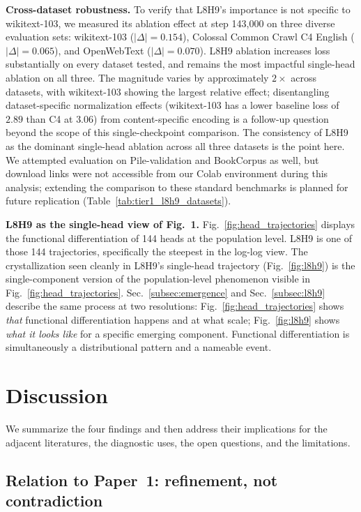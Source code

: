 \documentclass{article}
\begin{document}
\textbf{Cross-dataset robustness.} To verify that L8H9's importance is not specific to wikitext-103, we measured its ablation effect at step 143{,}000 on three diverse evaluation sets: wikitext-103 ($|\Delta| = 0.154$), Colossal Common Crawl C4 English ($|\Delta| = 0.065$), and OpenWebText ($|\Delta| = 0.070$). L8H9 ablation increases loss substantially on every dataset tested, and remains the most impactful single-head ablation on all three. The magnitude varies by approximately $2\times$ across datasets, with wikitext-103 showing the largest relative effect; disentangling dataset-specific normalization effects (wikitext-103 has a lower baseline loss of $2.89$ than C4 at $3.06$) from content-specific encoding is a follow-up question beyond the scope of this single-checkpoint comparison. The consistency of L8H9 as the dominant single-head ablation across all three datasets is the point here. We attempted evaluation on Pile-validation and BookCorpus as well, but download links were not accessible from our Colab environment during this analysis; extending the comparison to these standard benchmarks is planned for future replication (Table~\ref{tab:tier1_l8h9_datasets}).

\textbf{L8H9 as the single-head view of Fig.~1.} Fig.~\ref{fig:head_trajectories} displays the functional differentiation of 144 heads at the population level. L8H9 is one of those 144 trajectories, specifically the steepest in the log-log view. The crystallization seen cleanly in L8H9's single-head trajectory (Fig.~\ref{fig:l8h9}) is the single-component version of the population-level phenomenon visible in Fig.~\ref{fig:head_trajectories}. Sec.~\ref{subsec:emergence} and Sec.~\ref{subsec:l8h9} describe the same process at two resolutions: Fig.~\ref{fig:head_trajectories} shows \emph{that} functional differentiation happens and at what scale; Fig.~\ref{fig:l8h9} shows \emph{what it looks like} for a specific emerging component. Functional differentiation is simultaneously a distributional pattern and a nameable event.

\section{Discussion}
\label{sec:discussion}

We summarize the four findings and then address their implications for the adjacent literatures, the diagnostic uses, the open questions, and the limitations.

\subsection{Relation to Paper~1: refinement, not contradiction}
\end{document}
